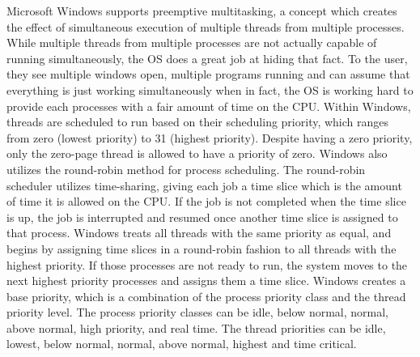 \documentclass[letterpaper,10pt,draftclsnofoot,onecolumn,titlepage]{IEEEtran}
\begin{document}
		Microsoft Windows supports preemptive multitasking, a concept which creates the effect of simultaneous execution of multiple threads from multiple processes. While multiple threads from multiple processes are not actually capable of running simultaneously, the OS does a great job at hiding that fact.
		To the user, they see multiple windows open, multiple programs running and can assume that everything is just working simultaneously when in fact, the OS is working hard to provide each processes with a fair amount of time on the CPU.
		Within Windows, threads are scheduled to run based on their scheduling priority, which ranges from zero (lowest priority) to 31 (highest priority).
		Despite having a zero priority, only the zero-page thread is allowed to have a priority of zero. Windows also utilizes the round-robin method for process scheduling.
		The round-robin scheduler utilizes time-sharing, giving each job a time slice which is the amount of time it is allowed on the CPU.
		If the job is not completed when the time slice is up, the job is interrupted and resumed once another time slice is assigned to that process.
		Windows treats all threads with the same priority as equal, and begins by assigning time slices in a round-robin fashion to all threads with the highest priority.
		If those processes are not ready to run, the system moves to the next highest priority processes and assigns them a time slice.
		Windows creates a base priority, which is a combination of the process priority class and the thread priority level.
		The process priority classes can be idle, below normal, normal, above normal, high priority, and real time.
		The thread priorities can be idle, lowest, below normal, normal, above normal, highest and time critical.
\end{document}
